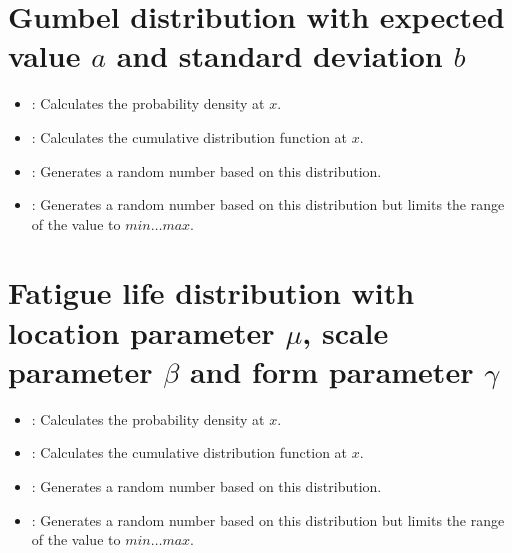 \section{Gumbel distribution with expected value \texorpdfstring{$a$}{a} and standard deviation \texorpdfstring{$b$}{b}}

\begin{itemize}

\item
{}:
Calculates the probability density at $x$.

\item
{}:
Calculates the cumulative distribution function at $x$.

\item
{}:
Generates a random number based on this distribution.

\item
{}:
Generates a random number based on this distribution but limits the range of the value to $min\ldots max$.

\end{itemize}



\section{Fatigue life distribution with location parameter \texorpdfstring{$\mu$}{mu}, scale parameter \texorpdfstring{$\beta$}{beta} and form parameter \texorpdfstring{$\gamma$}{gamma}}

\begin{itemize}

\item
{}:
Calculates the probability density at $x$.

\item
{}:
Calculates the cumulative distribution function at $x$.

\item
{}:
Generates a random number based on this distribution.

\item
{}:
Generates a random number based on this distribution but limits the range of the value to $min\ldots max$.

\end{itemize}



